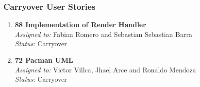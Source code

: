 \subsubsection*{Carryover User Stories}

\begin{enumerate}
    \item \textbf{88 Implementation of Render Handler} \\
    \textit{Assigned to:} Fabian Romero and Sebastian Sebastian Barra\\
    \textit{Status:} Carryover
    \item \textbf{72 Pacman UML} \\
    \textit{Assigned to:} Victor Villca, Jhael Arce and Ronaldo Mendoza \\
    \textit{Status:} Carryover
\end{enumerate}

